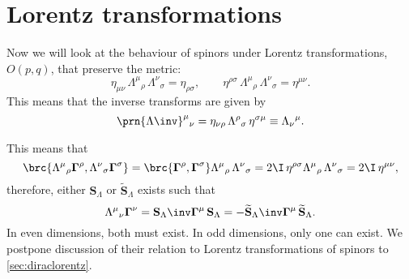 \documentclass[11pt]{article}
\newcommand{\Gammab}{\boldsymbol{\Gamma}}
\renewcommand{\S}{\mathbf{S}}
\newcommand{\St}{\widetilde{\S}}
\begin{document}

\section{Lorentz transformations}\label{sec:lorentz}

Now we will look at the behaviour of spinors under Lorentz transformations, \(O(p,q)\), that preserve the metric:
%
\begin{equation}\label{eq:lorentz}
  \eta_{\mu\nu}\, \Lambda^\mu{}_\rho\, \Lambda^\nu{}_\sigma = \eta_{\rho\sigma},
  \qquad
  \eta^{\rho\sigma}\, \Lambda^\mu{}_\rho\, \Lambda^\nu{}_\sigma = \eta^{\mu\nu}.
\end{equation}
%
This means that the inverse transforms are given by
%
\begin{equation}\label{eq:invlorentz}
  \prn{\Lambda\inv}^\mu{}_\nu = \eta_{\nu\rho}\, \Lambda^\rho{}_\sigma\, \eta^{\sigma\mu}
  \equiv \Lambda_\nu{}^\mu.
\end{equation}
%

This means that 
%
\begin{equation*}
  \brc{\Lambda^\mu{}_\rho \Gammab^\rho, \Lambda^\nu{}_\sigma \Gammab^\sigma}
    = \brc{\Gammab^\rho, \Gammab^\sigma} \Lambda^\mu{}_\rho\, \Lambda^\nu{}_\sigma
    = 2 \I\, \eta^{\rho\sigma} \Lambda^\mu{}_\rho\, \Lambda^\nu{}_\sigma
    = 2 \I\, \eta^{\mu\nu},
\end{equation*}
%
therefore, either \(\S_\Lambda\) or \(\St_\Lambda\) exists such that
%
\begin{equation}\label{eq:spinlorentz}
  \Lambda^\mu{}_\nu \Gammab^\nu = \S_\Lambda\inv \Gammab^\mu\, \S_\Lambda
  = - \St_\Lambda\inv \Gammab^\mu\, \St_\Lambda.
\end{equation}
%
In even dimensions, both must exist.
In odd dimensions, only one can exist.
We postpone discussion of their relation to Lorentz transformations of spinors to \cref{sec:diraclorentz}.
\end{document}
